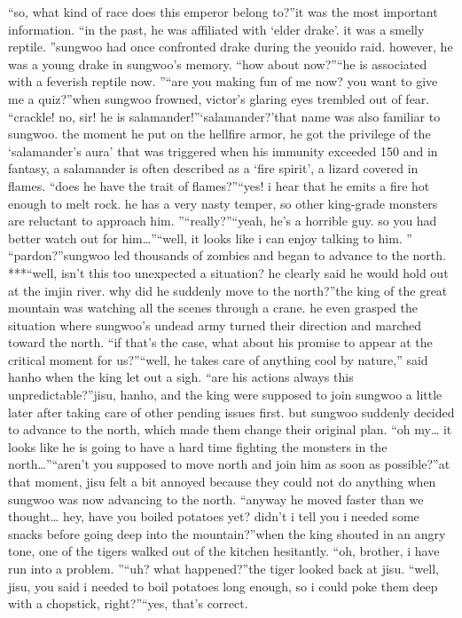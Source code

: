 “so, what kind of race does this emperor belong to?”it was the most important information.
“in the past, he was affiliated with ‘elder drake’.
 it was a smelly reptile.
”sungwoo had once confronted drake during the yeouido raid.
 however, he was a young drake in sungwoo’s memory.
“how about now?”“he is associated with a feverish reptile now.
”“are you making fun of me now? you want to give me a quiz?”when sungwoo frowned, victor’s glaring eyes trembled out of fear.
“crackle! no, sir! he is salamander!”‘salamander?’that name was also familiar to sungwoo.
 the moment he put on the hellfire armor, he got the privilege of the ‘salamander’s aura’ that was triggered when his immunity exceeded 150%
and in fantasy, a salamander is often described as a ‘fire spirit’, a lizard covered in flames.
“does he have the trait of flames?”“yes! i hear that he emits a fire hot enough to melt rock.
 he has a very nasty temper, so other king-grade monsters are reluctant to approach him.
”“really?”“yeah, he’s a horrible guy.
 so you had better watch out for him…”“well, it looks like i can enjoy talking to him.
”
“pardon?”sungwoo led thousands of zombies and began to advance to the north.
***“well, isn’t this too unexpected a situation? he clearly said he would hold out at the imjin river.
 why did he suddenly move to the north?”the king of the great mountain was watching all the scenes through a crane.
 he even grasped the situation where sungwoo’s undead army turned their direction and marched toward the north.
“if that’s the case, what about his promise to appear at the critical moment for us?”“well, he takes care of anything cool by nature,” said hanho when the king let out a sigh.
“are his actions always this unpredictable?”jisu, hanho, and the king were supposed to join sungwoo a little later after taking care of other pending issues first.
but sungwoo suddenly decided to advance to the north, which made them change their original plan.
“oh my… it looks like he is going to have a hard time fighting the monsters in the north…”“aren’t you supposed to move north and join him as soon as possible?”at that moment, jisu felt a bit annoyed because they could not do anything when sungwoo was now advancing to the north.
“anyway he moved faster than we thought… hey, have you boiled potatoes yet? didn’t i tell you i needed some snacks before going deep into the mountain?”when the king shouted in an angry tone, one of the tigers walked out of the kitchen hesitantly.
“oh, brother, i have run into a problem.
”“uh? what happened?”the tiger looked back at jisu.
“well, jisu, you said i needed to boil potatoes long enough, so i could poke them deep with a chopstick, right?”“yes, that’s correct.
